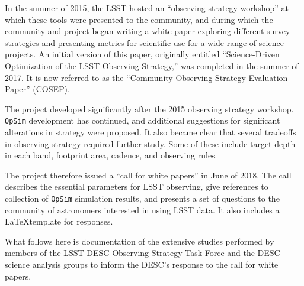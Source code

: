 In the summer of 2015, the LSST hosted an ``observing strategy
workshop'' at which these tools were presented to the community, and
during which the community and project began writing a white paper
exploring different survey strategies and presenting metrics for
scientific use for a wide range of science projects. An initial
version of this paper, originally entitled ``Science-Driven
Optimization of the LSST Observing Strategy,'' was completed in the
summer of 2017. It is now referred to as the ``Community Observing
Strategy Evaluation Paper'' (COSEP).

The project developed significantly after the 2015 observing
strategy workshop. {\tt OpSim} development has continued, and
additional suggestions for significant alterations in strategy were
proposed. It also became clear that several tradeoffs in observing
strategy required further study. Some of these include target depth in
each band, footprint area, cadence, and observing rules.

The project therefore issued a ``call for white papers'' in June of
2018. The call describes the essential parameters for LSST observing,
give references to collection of {\tt OpSim} simulation results, and
presents a set of questions to the community of astronomers interested
in using LSST data. It also includes a \LaTeX  template for responses.

What follows here is documentation of the extensive studies performed
by members of the LSST DESC Observing Strategy Task Force and the DESC
science analysis groups to inform the DESC's response to the call for
white papers.
